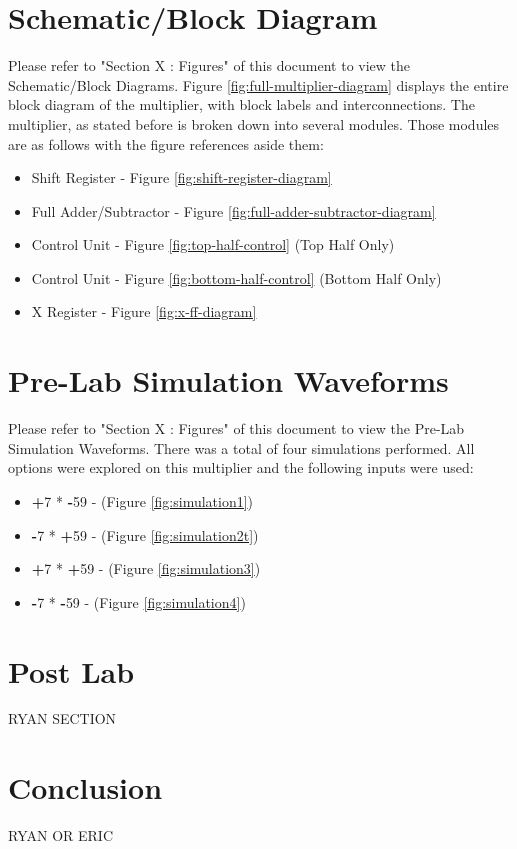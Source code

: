 \documentclass[journal, twocolumn, final,11pt,letterpaper]{IEEEtran}
\begin{document}
\section{Schematic/Block Diagram}
Please refer to "Section X : Figures" of this document to view the Schematic/Block Diagrams. Figure \ref{fig:full-multiplier-diagram} displays the entire block diagram of the multiplier, with block labels and interconnections. The multiplier, as stated before is broken down into several modules. Those modules are as follows with the figure references aside them:
\begin{itemize}
	\item Shift Register - Figure \ref{fig:shift-register-diagram}
	\item Full Adder/Subtractor - Figure \ref{fig:full-adder-subtractor-diagram}
	\item Control Unit - Figure \ref{fig:top-half-control} (Top Half Only)
	\item Control Unit - Figure \ref{fig:bottom-half-control} (Bottom Half Only)
	\item X Register - Figure \ref{fig:x-ff-diagram}
\end{itemize}

\section{Pre-Lab Simulation Waveforms}
Please refer to "Section X : Figures" of this document to view the Pre-Lab Simulation Waveforms. There was a total of four simulations performed. All options were explored on this multiplier and the following inputs were used: 
\begin{itemize}
	\item \textbf{+}7 * \textbf{-}59 - (Figure \ref{fig:simulation1})
	\item \textbf{-}7 * \textbf{+}59 - (Figure \ref{fig:simulation2t})
	\item \textbf{+}7 * \textbf{+}59 - (Figure \ref{fig:simulation3})
	\item \textbf{-}7 * \textbf{-}59  - (Figure \ref{fig:simulation4})
\end{itemize}
\section{Post Lab}
RYAN SECTION

\section{Conclusion}
RYAN OR ERIC
\end{document}
